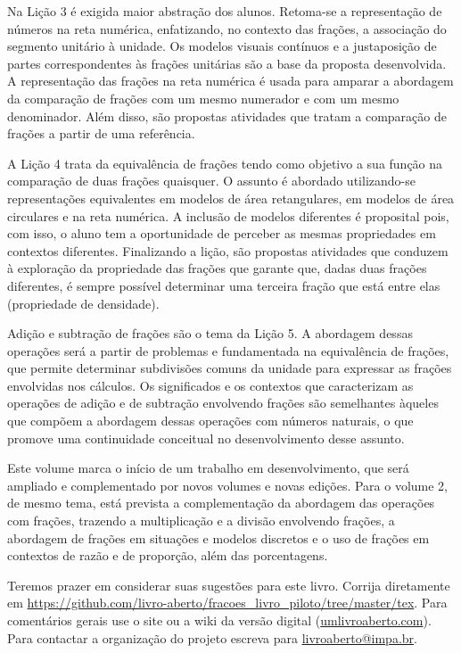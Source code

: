 Na Lição 3 é exigida maior abstração dos alunos. Retoma-se a representação de números na reta numérica, enfatizando, no contexto das frações, a associação do segmento unitário à unidade. Os modelos visuais contínuos e a justaposição de partes correspondentes às frações unitárias são a base da proposta desenvolvida. A representação das frações na reta numérica é usada para amparar a abordagem da comparação de frações com um mesmo numerador e com um mesmo denominador. Além disso, são propostas atividades que tratam a comparação de frações a partir de uma referência.

A Lição 4 trata da equivalência de frações tendo como objetivo a sua função na comparação de duas frações quaisquer. O assunto é abordado utilizando-se representações equivalentes em modelos de área retangulares, em modelos de área circulares e na reta numérica. A inclusão de modelos diferentes é proposital pois, com isso, o aluno tem a oportunidade de perceber as mesmas propriedades em contextos diferentes. Finalizando a lição, são propostas atividades que conduzem à exploração da propriedade das frações que garante que, dadas duas frações diferentes, é sempre possível determinar uma terceira fração que está entre elas (propriedade de densidade).

Adição e subtração de frações são o tema da Lição 5.
A abordagem dessas operações será a partir de problemas e fundamentada na equivalência de frações, que permite determinar subdivisões comuns da unidade para expressar as frações envolvidas nos cálculos.
Os significados e os contextos que caracterizam as operações de adição e de subtração ​envolvendo frações são semelhantes àqueles que compõem a abordagem dessas operações com números naturais, ​o que ​promove​​ uma continuidade conceitual ​no desenvolvimento desse assunto.

Este volume marca o início de um trabalho em desenvolvimento, que será ampliado e complementado por novos volumes e novas edições. Para o volume 2, de mesmo tema, está prevista a complementação da abordagem das operações com frações, trazendo a multiplicação e a divisão envolvendo frações, a abordagem de frações em situações e modelos discretos e o uso de frações em contextos de razão e de proporção, além das porcentagens.


Teremos prazer em considerar suas sugestões para este livro. 
Corrija diretamente em \textcolor{blue}{\url{https://github.com/livro-aberto/fracoes_livro_piloto/tree/master/tex}}.\newline
Para comentários gerais use o site ou a wiki da versão digital (\textcolor{blue}{\url{umlivroaberto.com}}).
Para contactar a organização do projeto escreva para \textcolor{blue}{\url{livroaberto@impa.br}}.
